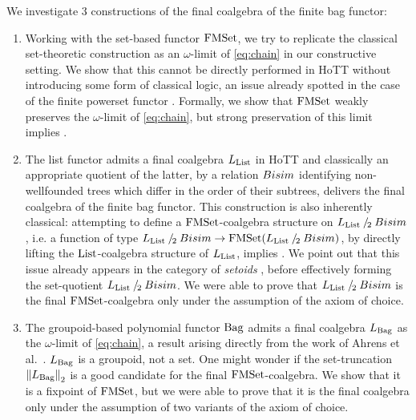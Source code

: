 \documentclass[final,a4paper,USenglish,cleveref]{lipics-v2021}
\begin{document}
We investigate 3 constructions of the final coalgebra of the finite bag functor:
\begin{enumerate}
  \item Working with the set-based functor $\FMSet$, we try to replicate the classical set-theoretic construction as an $\omega$-limit of \eqref{eq:chain} in our constructive setting. We show that this cannot be directly performed in HoTT without introducing some form of classical logic, an issue already spotted in the case of the finite powerset functor \cite{Veltri2021}. Formally, we show that $\FMSet$ weakly preserves the $\omega$-limit of \eqref{eq:chain},
but strong preservation of this limit implies \LLPO{}.
\item The list functor admits a final coalgebra $\Lim{\List}$ in HoTT \cite{Ahrens2015} and classically an appropriate quotient of the latter, by a relation $\Bisim$ identifying non-wellfounded trees which differ in the order of their subtrees, delivers the final coalgebra of the finite bag functor.
  This construction is also inherently classical: attempting to define a $\FMSet$-coalgebra structure on $\Lim{\List} \mathbin{/_{\!2}} \Bisim$, i.e. a function of type $\Lim{\List} \mathbin{/_{\!2}} \Bisim \to \FMSet (\Lim{\List} \mathbin{/_{\!2}} \Bisim)$, by directly lifting the $\List$-coalgebra structure of $\Lim{\List}$, implies \LLPO{}. We point out that this issue already appears in the category of \emph{setoids} \cite{Barthe2003}, before effectively forming the set-quotient $\Lim{\List} \mathbin{/_{\!2}} \Bisim$.
  We were able to prove that $\Lim{\List} \mathbin{/_{\!2}} \Bisim$ is the final $\FMSet$-coalgebra only under the assumption of the axiom of choice. 
\item The groupoid-based polynomial functor $\Bag$ admits a final coalgebra $\Lim{\Bag}$ as the $\omega$-limit of \eqref{eq:chain}, a result arising directly from the work of Ahrens et al.~\cite{Ahrens2015}. $\Lim{\Bag}$ is a groupoid, not a set. One might wonder if the set-truncation $\SetTrunc{\Lim{\Bag}}$ is a good candidate for the final $\FMSet$-coalgebra. We show that it is a fixpoint of $\FMSet$, but we were able to prove that it is the final coalgebra only under the assumption of two variants of the axiom of choice. 
\end{enumerate}
\end{document}
